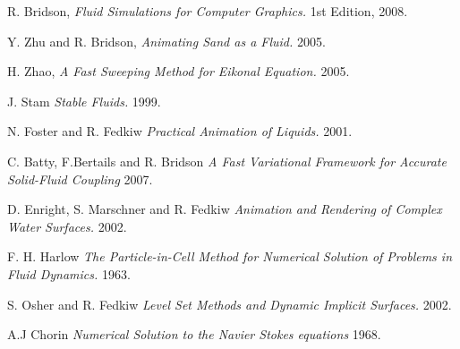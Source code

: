 \begin{thebibliography}{9}

  R. Bridson,
  \emph{Fluid Simulations for Computer Graphics.}
  1st Edition,
  2008.

  Y. Zhu and R. Bridson,
  \emph{Animating Sand as a Fluid.}
  2005.

  H. Zhao, 
  \emph{A Fast Sweeping Method for Eikonal Equation.}
  2005.

  J. Stam
  \emph{Stable Fluids.}
  1999.

  N. Foster and R. Fedkiw
  \emph{Practical Animation of Liquids.}
  2001.

  C. Batty, F.Bertails and R. Bridson
  \emph{A Fast Variational Framework for Accurate Solid-Fluid Coupling}
  2007.

  D. Enright, S. Marschner and R. Fedkiw
  \emph{Animation and Rendering of Complex Water Surfaces.}
  2002.

  F. H. Harlow 
  \emph{The Particle-in-Cell Method for Numerical Solution of Problems in Fluid Dynamics.}
  1963.

  S. Osher and R. Fedkiw
  \emph{Level Set Methods and Dynamic Implicit Surfaces.}
  2002.

  A.J Chorin
  \emph{Numerical Solution to the Navier Stokes equations}
  1968.

\end{thebibliography}
